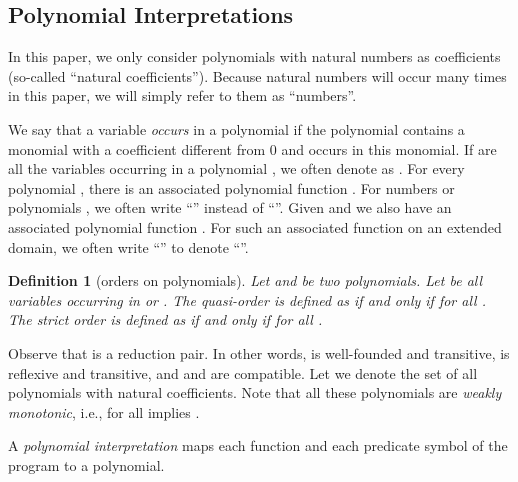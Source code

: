 \documentclass[envcountsame]{tlp}
\newcounter{ex:der-lastsymconsctr}
\newtheorem{definition}{Definition}
\begin{document}
\subsection{Polynomial Interpretations}
\label{poly_interpretation}



In this paper, we only consider polynomials with natural numbers as
coefficients (so-called ``natural coefficients'').
Because natural numbers will occur many times in this paper, we will 
simply refer to them as ``numbers''.

We say that a variable  \emph{occurs} in a polynomial  if the polynomial
contains a monomial with a coefficient different from 0 and  occurs in
this monomial.
If  are all the variables occurring in a polynomial , we often
denote  as . For every polynomial ,
there is an associated polynomial function  .
For numbers or polynomials , we often write
``''
instead of ``''.
Given  and  we also have 
an associated polynomial function  . For such 
an associated function on an extended domain, we often write 
``'' to denote 
``''.








\begin{definition}[orders on polynomials]
\label{ordersonnaturals}
Let  and  be two polynomials.
Let  be all variables occurring
in  or . The quasi-order
  is defined as
 if and only if  for
all .
The strict order 
is defined as  if and only
if   for
all .
\end{definition}










Observe that  is a reduction pair.
In other words, 
 is well-founded and transitive,
 is reflexive and transitive, and  and 
 are compatible.
Let  we denote the set of all polynomials with natural
coefficients.  Note that all these polynomials  are \emph{weakly
monotonic}, i.e.,  for all  implies
.

A \emph{polynomial interpretation} maps
each function and each predicate symbol of the program to a polynomial.
\end{document}

